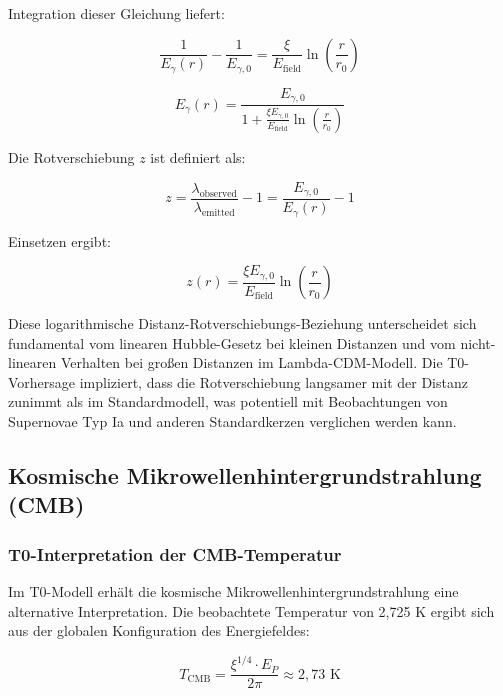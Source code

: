 \documentclass[12pt,a4paper]{article}
\theoremstyle{definition}
\begin{document}
Integration dieser Gleichung liefert:

\begin{equation}
	\frac{1}{E_\gamma(r)} - \frac{1}{E_{\gamma,0}} = \frac{\xi}{E_{\text{field}}} \ln\left(\frac{r}{r_0}\right)
\end{equation}

\begin{equation}
	E_\gamma(r) = \frac{E_{\gamma,0}}{1 + \frac{\xi E_{\gamma,0}}{E_{\text{field}}} \ln\left(\frac{r}{r_0}\right)}
\end{equation}

Die Rotverschiebung $z$ ist definiert als:

\begin{equation}
	z = \frac{\lambda_{\text{observed}}}{\lambda_{\text{emitted}}} - 1 = \frac{E_{\gamma,0}}{E_\gamma(r)} - 1
\end{equation}

Einsetzen ergibt:

\begin{equation}
	\boxed{z(r) = \frac{\xi E_{\gamma,0}}{E_{\text{field}}} \ln\left(\frac{r}{r_0}\right)}
\end{equation}

\begin{wichtig}
	Diese logarithmische Distanz-Rotverschiebungs-Beziehung unterscheidet sich fundamental vom linearen Hubble-Gesetz bei kleinen Distanzen und vom nicht-linearen Verhalten bei großen Distanzen im Lambda-CDM-Modell. Die T0-Vorhersage impliziert, dass die Rotverschiebung langsamer mit der Distanz zunimmt als im Standardmodell, was potentiell mit Beobachtungen von Supernovae Typ Ia und anderen Standardkerzen verglichen werden kann.
\end{wichtig}

\subsection{Kosmische Mikrowellenhintergrundstrahlung (CMB)}

\subsubsection{T0-Interpretation der CMB-Temperatur}

Im T0-Modell erhält die kosmische Mikrowellenhintergrundstrahlung eine alternative Interpretation. Die beobachtete Temperatur von 2,725 K ergibt sich aus der globalen Konfiguration des Energiefeldes:

\begin{equation}
	T_{\text{CMB}} = \frac{\xi^{1/4} \cdot E_P}{2\pi} \approx 2,73 \text{ K}
\end{equation}
\end{document}
